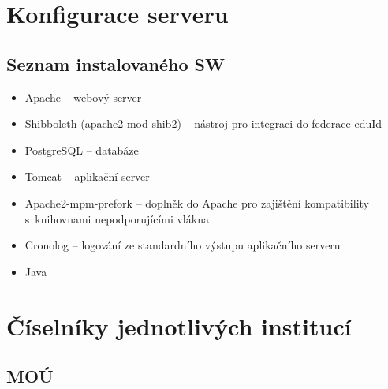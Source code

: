 \documentclass[11pt, final, oneside]{fithesis2}
\begin{document}
\begin{appendix}
\chapter{Konfigurace serveru}\label{appendix:server}

\section{Seznam instalovaného SW}
\begin{itemize}
	\item Apache -- webový server
	\item Shibboleth (apache2-mod-shib2) -- nástroj pro integraci do federace eduId
	\item PostgreSQL -- databáze
	\item Tomcat -- aplikační server
	\item Apache2-mpm-prefork -- doplněk do Apache pro zajištění kompatibility s~knihovnami nepodporujícími vlákna
	\item Cronolog -- logování ze standardního výstupu aplikačního serveru
	\item Java 
	
\end{itemize}

\chapter{Číselníky jednotlivých institucí}

\section{MOÚ}


\end{appendix}
\end{document}
